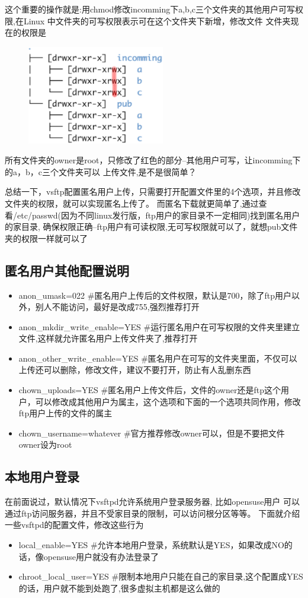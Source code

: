 \documentclass[adobefonts]{ctexart}
\begin{document}
这个重要的操作就是:用chmod修改incomming下a,b,c三个文件夹的其他用户可写权限,在Linux
中文件夹的可写权限表示可在这个文件夹下新增，修改文件
文件夹现在的权限是
\begin{figure}[htbp]
  \includegraphics[width=6cm]{perm.eps}
\end{figure}
所有文件夹的owner是root，只修改了红色的部分--其他用户可写，让incomming下的a，b，c三个文件夹可以
上传文件,是不是很简单？

总结一下，vsftp配置匿名用户上传，只需要打开配置文件里的4个选项，并且修改文件夹的权限，就可以实现匿名上传了。
而匿名下载就更简单了,通过查看/etc/passwd(因为不同linux发行版，ftp用户的家目录不一定相同)找到匿名用户的家目录,
确保权限正确--ftp用户有可读权限,无可写权限就可以了，就想pub文件夹的权限一样就可以了
\subsection{匿名用户其他配置说明}

\begin{itemize}
    \item anon\_umask=022                \#匿名用户上传后的文件权限，默认是700，除了ftp用户以外，别人不能访问，最好是改成755,强烈推荐打开
    \item anon\_mkdir\_write\_enable=YES \#运行匿名用户在可写权限的文件夹里建立文件,这样就允许匿名用户上传文件夹了,推荐打开
	\item anon\_other\_write\_enable=YES \#匿名用户在可写的文件夹里面，不仅可以上传还可以删除，修改文件，建议不要打开，防止有人乱删东西
    \item chown\_uploads=YES              \#匿名用户上传文件后，文件的owner还是ftp这个用户，可以修改成其他用户为属主，这个选项和下面的一个选项共同作用，修改ftp用户上传的文件的属主        
	\item chown\_username=whatever        \#官方推荐修改owner可以，但是不要把文件owner设为root
\end{itemize}

\subsection{本地用户登录}
在前面说过，默认情况下vsftpd允许系统用户登录服务器, 比如opensuse用户
可以通过ftp访问服务器，并且不受家目录的限制，可以访问根分区等等。
下面就介绍一些vsftpd的配置文件，修改这些行为
\begin{itemize}
    \item local\_enable=YES     \#允许本地用户登录，系统默认是YES，如果改成NO的话，像opensuse用户就没有办法登录了
    \item chroot\_local\_user=YES  \#限制本地用户只能在自己的家目录,这个配置成YES的话，用户就不能到处跑了,很多虚拟主机都是这么做的
\end{itemize}
\end{document}
